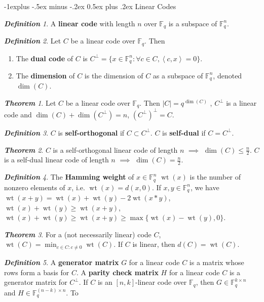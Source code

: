 \documentclass[frenchspacing,9pt,landscape,a4paper]{article}
\makeatletter
\renewcommand{\subsection}{\@startsection{subsection}{2}{0mm}%
                                {-1explus -.5ex minus -.2ex}%
                                {0.5ex plus .2ex}%
                                {\normalfont\normalsize\bfseries}}
\newcommand{\BF}{\mathbb F}
\newcommand{\tb}[1]{\textbf {#1}}
\newcommand{\abs}[1]{\left\lvert #1 \right\rvert}
\newcommand{\innerproduct}[2]{\left\langle #1, #2 \right\rangle}
\DeclareMathOperator{\wt}{wt}
\theoremstyle{remark}
\newtheorem*{thm}{\textbf{Theorem}}
\newtheorem*{defn}{\textbf{Definition}}
\makeatother
\begin{document}
\begin{multicols}{4}
\subsection{Linear Codes}
\begin{defn}
    A \tb{linear code} with length $n$ over  $\BF_q$ is a subspace of  $\BF_q^n$.
\end{defn}
\begin{defn}
    Let $C$ be a linear code over  $\BF_q$. Then 
     \begin{enumerate}
         \item The \tb{dual code} of $C$ is  $C^\perp=\{x\in\BF_q^n:\forall c\in
             C,\innerproduct{c}{x}=0\}$.
         \item The \tb{dimension} of $C$ is the dimension of  $C$ as a subspace of  $\BF_q^n$, denoted
             $\dim(C)$. 
    \end{enumerate}
\end{defn}
\begin{thm}
    Let $C$ be a  linear code over $\BF_q$. Then $\abs{C}=q^{\dim(C)}$ , $C^\perp$ is a linear code and
    $\dim(C)+\dim(C^\perp)=n$,  $(C^\perp)^\perp=C$.
\end{thm}
\begin{defn}
    $C$ is \tb{self-orthogonal} if  $C\subset C^\perp$.  $C$ is \tb{self-dual} if  $C=C^\perp$.
\end{defn}
\begin{thm}
    $C$ is a self-orthogonal linear code of length  $n$  $\implies$  $\dim(C)\leq \frac{n}{2}$. $C$ is a
    self-dual linear code of length  $n$  $\implies$  $\dim(C)=\frac{n}{2}$.
\end{thm}
\begin{defn}
    The \tb{Hamming weight} of $x\in\BF_q^n$  $\wt(x)$ is the number of nonzero elements of  $x$, i.e.
    $\wt(x)=d(x,0)$. If $x,y\in\BF_q^n$, we have  $\wt(x+y)=\wt(x)+\wt(y)-2\wt(x*y)$,
    $\wt(x)+\wt(y)\geq\wt(x+y)$,  $\wt(x)+\wt(y)\geq\wt(x+y)\geq\max\{\wt(x)-\wt(y),0\}$.
\end{defn}
\begin{thm}
    For a (not necessarily linear) code $C$,  $\wt(C)=\min_{c\in C:c\neq 0}\wt(C)$. If  $C$ is linear, then
     $d(C)=\wt(C)$.
\end{thm}
\begin{defn}
    A \tb{generator matrix} $G$ for a linear code  $C$ is a matrix whose rows form a basis for  $C$. A
    \tb{parity check matrix}  $H$ for a linear code  $C$ is a generator matrix for  $C^\perp$. If $C$ is an
    $[n,k]$-linear code over  $\BF_q$, then  $G\in\BF_q^{k\times n}$ and  $H\in\BF_q^{(n-k)\times n}$. To

\end{defn}
\end{multicols}
\end{document}
